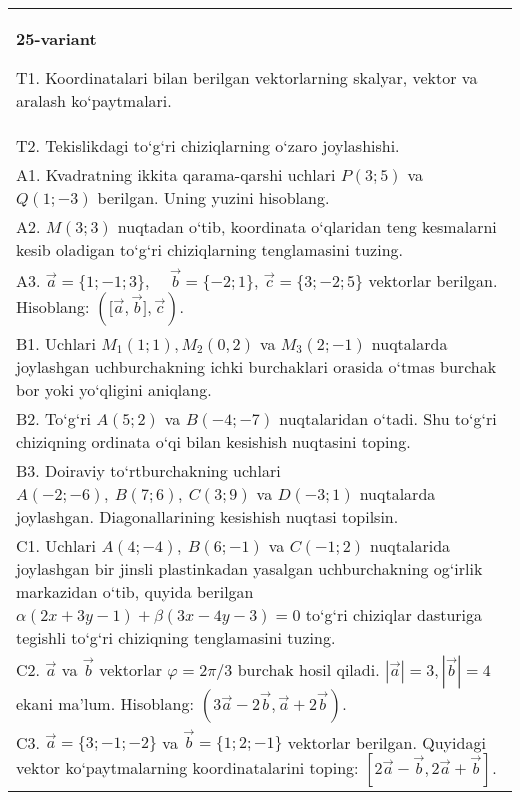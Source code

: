 \documentclass{article}
\begin{document}
\begin{tabular}{m{17cm}}
\textbf{25-variant}

T1. 
Koordinatalari bilan berilgan vektorlarning skalyar, vektor va aralash ko‘paytmalari.
 \\
T2. 
Tekislikdagi to‘g‘ri chiziqlarning o‘zaro joylashishi.
 \\
A1. 
Kvadratning ikkita qarama-qarshi uchlari $P (3; 5) $ va
$Q (1; -3) $ berilgan. Uning yuzini hisoblang.
 \\
A2. 
$M (3;3)$ nuqtadan o‘tib, koordinata o‘qlaridan teng
kesmalarni kesib oladigan to‘g‘ri chiziqlarning tenglamasini tuzing.
 \\
A3. 
$\overrightarrow{a}
= \{ 1; - 1;3\}, \ \ \ \ \ \overrightarrow{b} = \{ - 2;1\}$, $\overrightarrow{c} = \{3; -2;5\}$ vektorlar berilgan. Hisoblang:
$ (\lbrack\overrightarrow{a},\overrightarrow{b}\rbrack,\overrightarrow{c}) $.
 \\
B1. 
Uchlari \(M_{1} (1;1), M_{2} (0,2) \) va
\(M_{3} (2;-1) \) nuqtalarda joylashgan uchburchakning ichki 
burchaklari orasida o‘tmas burchak bor yoki yo‘qligini aniqlang.
 \\
B2. 
To‘g‘ri \(A (5;2) \) va \(B (-4; -7) \) nuqtalaridan o‘tadi.
Shu to‘g‘ri chiziqning ordinata o‘qi bilan kesishish nuqtasini toping.
 \\
B3. 
Doiraviy to‘rtburchakning uchlari
\(A (-2;-6),\ B (7;6),\ C (3;9) \) va \(D (-3;1) \) nuqtalarda
joylashgan. Diagonallarining kesishish nuqtasi topilsin.
 \\
C1. 
Uchlari \(A (4;-4),\ B (6;-1) \) va \(C (-1;2) \)
nuqtalarida joylashgan bir jinsli plastinkadan yasalgan uchburchakning
og‘irlik markazidan o‘tib, quyida berilgan
\(\alpha (2x+3y-1) +\beta (3x-4y-3) =0\) to‘g‘ri chiziqlar dasturiga
tegishli to‘g‘ri chiziqning tenglamasini tuzing.
 \\
C2. 
$\vec{a}$ va $\vec{b}$ vektorlar $\varphi = 2\pi/3$ burchak hosil qiladi. $|\vec{a}| = 3,|\vec{b}| = 4$ ekani ma’lum. Hisoblang:
$\left(3\vec{a} - 2\vec{b},\vec{a} + 2\vec{b} \right) $.
 \\
C3. 
$\vec{a} = \{ 3; - 1; - 2\}$ va $\vec{b} = \{ 1;2; - 1\}$ vektorlar berilgan. Quyidagi vektor ko‘paytmalarning koordinatalarini toping:
$\left\lbrack 2\vec{a} - \vec{b},2\vec{a} + \vec{b} \right\rbrack$.
 \\

\end{tabular}
\vspace{1cm}
\end{document}
